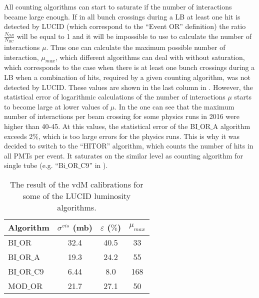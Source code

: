 % 
% 
All counting algorithms can start to saturate if the number of interactions became large enough.
If in all bunch crossings during a LB at least one hit is detected by LUCID (which correspond to the ``Event OR'' definition) 
the ratio $\frac{N_{OR}}{N_{BC}}$ will be equal to 1 and it will be impossible to use  to calculate 
the number of interactions $\mu$. 
Thus one can calculate the maximum possible number of interaction,
$\mu_{max}$, which different algorithms can deal with without saturation, 
which corresponds to the case when there is at least one bunch crossings during a LB
when a combination of hits, required by a given counting algorithm, was not detected by LUCID.
These values are shown in the last column in .
However, the statistical error of logarithmic calculations of the number of interactions $\mu$ starts to become large at lower values of $\mu$.
In the  one can see that the maximum number of interactions per beam crossing for some physics runs in 2016 were higher than 40-45. At this values, the statistical error of the BI$\_$OR$\_$A algorithm exceeds 2$\%$, which is too large errors for the physics runs.
This is why it was decided to switch to the ``HITOR'' algorithm, which counts the number of hits in all PMTs per event.
It saturates on the similar level as counting algorithm for single tube (e.g. ``Bi$\_$OR$\_$C9'' in ).

\begin{table}[p]
  \begin{tabular}{|l|c|c|c|}
    Algorithm & $\sigma^{vis}$ (mb) & $\varepsilon$ ($\%$) & $\mu_{max}$ \\
    \hline
    BI$\_$OR & 32.4 & 40.5 & 33 \\
    \hline
    BI$\_$OR$\_$A & 19.3 & 24.2 & 55 \\
    \hline
    BI$\_$OR$\_$C9 & 6.44 & 8.0 & 168 \\
    \hline
    MOD$\_$OR & 21.7 & 27.1 & 50 \\
  \end{tabular}
  \caption{The result of the vdM calibrations for some of the LUCID luminosity algorithms.}
  \label{tab:sigma_vis_efficiency}
\end{table}

